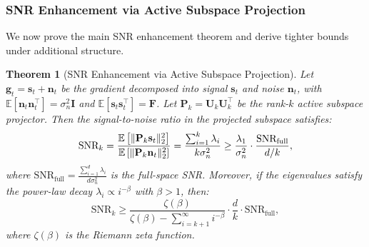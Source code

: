 ﻿\documentclass[lettersize,journal]{IEEEtran}
\newtheorem{theorem}{Theorem}
\begin{document}
\subsubsection{SNR Enhancement via Active Subspace Projection}
\label{sec:snr}

We now prove the main SNR enhancement theorem and derive tighter bounds under additional structure.

\begin{theorem}[SNR Enhancement via Active Subspace Projection]
\label{thm:snr}
Let $\mathbf{g}_t = \mathbf{s}_t + \mathbf{n}_t$ be the gradient decomposed into signal $\mathbf{s}_t$ and noise $\mathbf{n}_t$, with $\mathbb{E}[\mathbf{n}_t \mathbf{n}_t^\top] = \sigma_n^2 \mathbf{I}$ and $\mathbb{E}[\mathbf{s}_t \mathbf{s}_t^\top] = \mathbf{F}$. Let $\mathbf{P}_k = \mathbf{U}_k \mathbf{U}_k^\top$ be the rank-$k$ active subspace projector. Then the signal-to-noise ratio in the projected subspace satisfies:
\begin{equation}
\label{eq:snr_theorem}
\text{SNR}_k = \frac{\mathbb{E}\left[\|\mathbf{P}_k \mathbf{s}_t\|_2^2\right]}{\mathbb{E}\left[\|\mathbf{P}_k \mathbf{n}_t\|_2^2\right]} \\\\
= \frac{\sum_{i=1}^{k} \lambda_i}{k \sigma_n^2} \geq \frac{\lambda_1}{\sigma_n^2} \cdot \frac{\text{SNR}_{\text{full}}}{d/k},
\end{equation}
where $\text{SNR}_{\text{full}} = \frac{\sum_{i=1}^{d} \lambda_i}{d \sigma_n^2}$ is the full-space SNR. Moreover, if the eigenvalues satisfy the power-law decay $\lambda_i \propto i^{-\beta}$ with $\beta > 1$, then:
\begin{equation}
\label{eq:snr_powerlaw}
\text{SNR}_k \geq \frac{\zeta(\beta)}{\zeta(\beta) - \sum_{i=k+1}^{\infty} i^{-\beta}} \cdot \frac{d}{k} \cdot \text{SNR}_{\text{full}},
\end{equation}
where $\zeta(\beta)$ is the Riemann zeta function.
\end{theorem}
\end{document}
